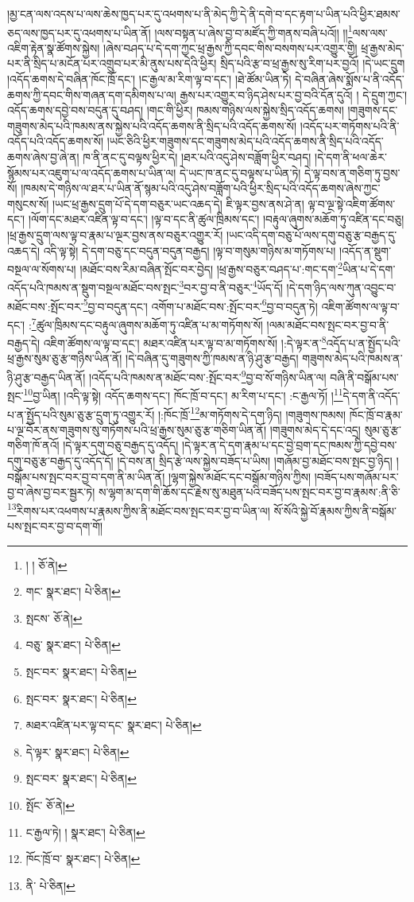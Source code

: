 །མྱ་ངན་ལས་འདས་པ་ལས་ཆེས་ཁྱད་པར་དུ་འཕགས་པ་ནི་མེད་ཀྱི་དེ་ནི་དགེ་བ་དང་རྟག་པ་ཡིན་པའི་ཕྱིར་ཐམས་ཅད་ལས་ཁྱད་པར་དུ་འཕགས་པ་ཡིན་ནོ། །ལས་བསྟན་པ་ཞེས་བྱ་བ་མཛོད་ཀྱི་གནས་བཞི་པའོ།། །།\footnote{། །  ཅོ་ནེ། }ལས་ལས་འཇིག་རྟེན་སྣ་ཚོགས་སྐྱེས། །ཞེས་བཤད་པ་དེ་དག་ཀྱང་ཕྲ་རྒྱས་ཀྱི་དབང་གིས་བསགས་པར་འགྱུར་གྱི། ཕྲ་རྒྱས་མེད་པར་ནི་སྲིད་པ་མངོན་པར་འགྲུབ་པར་མི་ནུས་པས་དེའི་ཕྱིར། སྲིད་པའི་རྩ་བ་ཕྲ་རྒྱས་སུ་རིག་པར་བྱའོ། །དེ་ཡང་དྲུག །འདོད་ཆགས་དེ་བཞིན་ཁོང་ཁྲོ་དང་། །ང་རྒྱལ་མ་རིག་ལྟ་བ་དང་། །ཐེ་ཚོམ་ཡིན་ཏེ། དེ་བཞིན་ཞེས་སྨོས་པ་ནི་འདོད་ཆགས་ཀྱི་དབང་གིས་གཞན་དག་དམིགས་པ་ལ། རྒྱས་པར་འགྱུར་བ་ཉིད་ཤེས་པར་བྱ་བའི་དོན་དུའོ། །
དེ་དྲུག་ཀྱང་། འདོད་ཆགས་དབྱེ་བས་བདུན་དུ་བཤད། །གང་གི་ཕྱིར། ཁམས་གཉིས་ལས་སྐྱེས་སྲིད་འདོད་ཆགས། །གཟུགས་དང་གཟུགས་མེད་པའི་ཁམས་ནས་སྐྱེས་པའི་འདོད་ཆགས་ནི་སྲིད་པའི་འདོད་ཆགས་སོ། །འདོད་པར་གཏོགས་པའི་ནི་འདོད་པའི་འདོད་ཆགས་སོ། །ཡང་ཅིའི་ཕྱིར་གཟུགས་དང་གཟུགས་མེད་པའི་འདོད་ཆགས་ནི་སྲིད་པའི་འདོད་ཆགས་ཞེས་བྱ་ཞེ་ན། ཁ་ནི་ནང་དུ་བལྟས་ཕྱིར་དེ། །ཐར་པའི་འདུ་ཤེས་བཟློག་ཕྱིར་བཤད། །དེ་དག་ནི་ཕལ་ཆེར་སྙོམས་པར་འཇུག་པ་ལ་འདོད་ཆགས་པ་ཡིན་ལ། དེ་ཡང་ཁ་ནང་དུ་བལྟས་པ་ཡིན་ཏེ། དེ་ལྟ་བས་ན་གཅིག་ཏུ་བྱས་སོ། །ཁམས་དེ་གཉིས་ལ་ཐར་པ་ཡིན་ནོ་སྙམ་པའི་འདུ་ཤེས་བཟློག་པའི་ཕྱིར་སྲིད་པའི་འདོད་ཆགས་ཞེས་ཀྱང་གསུངས་སོ། །ཡང་ཕྲ་རྒྱས་དྲུག་པོ་དེ་དག་བཅུར་ཡང་འཆད་དེ། ཇི་ལྟར་བྱས་ནས་ཤེ་ན། ལྟ་བ་ལྔ་སྟེ་འཇིག་ཚོགས་དང་། །ལོག་དང་མཐར་འཛིན་ལྟ་བ་དང་། །ལྟ་བ་དང་ནི་ཚུལ་ཁྲིམས་དང་། །བརྟུལ་ཞུགས་མཆོག་ཏུ་འཛིན་དང་བཅུ། །ཕྲ་རྒྱས་དྲུག་ལས་ལྟ་བ་རྣམ་པ་ལྔར་བྱས་ནས་བཅུར་འགྱུར་རོ། །ཡང་འདི་དག་བཅུ་པོ་ལས་དགུ་བཅུ་རྩ་བརྒྱད་དུ་འཆད་དེ། འདི་ལྟ་སྟེ། དེ་དག་བཅུ་དང་བདུན་བདུན་བརྒྱད། །ལྟ་བ་གསུམ་གཉིས་མ་གཏོགས་པ། །འདོད་ན་སྡུག་བསྔལ་ལ་སོགས་པ། །མཐོང་བས་རིམ་བཞིན་སྤོང་བར་བྱེད། །ཕྲ་རྒྱས་བཅུར་བཤད་པ་:གང་དག་\footnote{གང་  སྣར་ཐང་།  པེ་ཅིན། }ཡིན་པ་དེ་དག་འདོད་པའི་ཁམས་ན་སྡུག་བསྔལ་མཐོང་བས་སྤང་\footnote{སྤངས་  ཅོ་ནེ། }བར་བྱ་བ་ནི་བཅུར་\footnote{བཅུ་  སྣར་ཐང་།  པེ་ཅིན། }ཡོད་དོ། །དེ་དག་ཉིད་ལས་ཀུན་འབྱུང་བ་མཐོང་བས་:སྤོང་བར་\footnote{སྤང་བར་  སྣར་ཐང་།  པེ་ཅིན། }བྱ་བ་བདུན་དང་། འགོག་པ་མཐོང་བས་:སྤོང་བར་\footnote{སྤང་བར་  སྣར་ཐང་།  པེ་ཅིན། }བྱ་བ་བདུན་ཏེ། འཇིག་ཚོགས་ལ་ལྟ་བ་དང་། :\footnote{མཐར་འཛིན་པར་ལྟ་བ་དང་  སྣར་ཐང་།  པེ་ཅིན། }ཚུལ་ཁྲིམས་དང་བརྟུལ་ཞུགས་མཆོག་ཏུ་འཛིན་པ་མ་གཏོགས་སོ། །ལམ་མཐོང་བས་སྤང་བར་བྱ་བ་ནི་བརྒྱད་དེ། འཇིག་ཚོགས་ལ་ལྟ་བ་དང་། མཐར་འཛིན་པར་ལྟ་བ་མ་གཏོགས་སོ། །:དེ་ལྟར་ན་\footnote{དེ་ལྟར་  སྣར་ཐང་།  པེ་ཅིན། }འདོད་པ་ན་སྤྱོད་པའི་ཕྲ་རྒྱས་སུམ་ཅུ་རྩ་གཉིས་ཡིན་ནོ། །དེ་བཞིན་དུ་གཟུགས་ཀྱི་ཁམས་ན་ཉི་ཤུ་རྩ་བརྒྱད། གཟུགས་མེད་པའི་ཁམས་ན་ཉི་ཤུ་རྩ་བརྒྱད་ཡིན་ནོ། །འདོད་པའི་ཁམས་ན་མཐོང་བས་:སྤོང་བར་\footnote{སྤང་བར་  སྣར་ཐང་།  པེ་ཅིན། }བྱ་བ་སོ་གཉིས་ཡིན་ལ། བཞི་ནི་བསྒོམ་པས་སྤང་\footnote{སྤོང་  ཅོ་ནེ། }བྱ་ཡིན། །འདི་ལྟ་སྟེ། འདོད་ཆགས་དང་། ཁོང་ཁྲོ་བ་དང་། མ་རིག་པ་དང་། :ང་རྒྱལ་ཏོ། །\footnote{ང་རྒྱལ་ཏེ། །  སྣར་ཐང་།  པེ་ཅིན། }དེ་དག་ནི་འདོད་པ་ན་སྤྱོད་པའི་སུམ་ཅུ་རྩ་དྲུག་ཏུ་འགྱུར་རོ། །:ཁོང་ཁྲོ་\footnote{ཁོང་ཁྲོ་བ་  སྣར་ཐང་།  པེ་ཅིན། }མ་གཏོགས་དེ་དག་ཉིད། །གཟུགས་ཁམས། ཁོང་ཁྲོ་བ་རྣམ་པ་ལྔ་བོར་ནས་གཟུགས་སུ་གཏོགས་པའི་ཕྲ་རྒྱས་སུམ་ཅུ་རྩ་གཅིག་ཡིན་ནོ། །གཟུགས་མེད་དེ་དང་འདྲ། སུམ་ཅུ་རྩ་གཅིག་ཁོ་ནའོ། །དེ་ལྟར་དགུ་བཅུ་བརྒྱད་དུ་འདོད། །དེ་ལྟར་ན་དེ་དག་རྣམ་པ་དང་བྱེ་བྲག་དང་ཁམས་ཀྱི་དབྱེ་བས་དགུ་བཅུ་རྩ་བརྒྱད་དུ་འདོད་དོ། །དེ་བས་ན། སྲིད་རྩེ་ལས་སྐྱེས་བཟོད་པ་ཡིས། །གཞོམ་བྱ་མཐོང་བས་སྤང་བྱ་ཉིད། །བསྒོམ་པས་སྤང་བར་བྱ་བ་དག་ནི་མ་ཡིན་ནོ། །ལྷག་སྐྱེས་མཐོང་དང་བསྒོམ་གཉིས་ཀྱིས། །བཟོད་པས་གཞོམ་པར་བྱ་བ་ཞེས་བྱ་བར་སྦྱར་ཏེ། ས་ལྷག་མ་དག་གི་ཆོས་དང་རྗེས་སུ་མཐུན་པའི་བཟོད་པས་སྤང་བར་བྱ་བ་རྣམས་:ནི་ཅི་\footnote{ནི་  པེ་ཅིན། }རིགས་པར་འཕགས་པ་རྣམས་ཀྱིས་ནི་མཐོང་བས་སྤང་བར་བྱ་བ་ཡིན་ལ། སོ་སོའི་སྐྱེ་བོ་རྣམས་ཀྱིས་ནི་བསྒོམ་པས་སྤང་བར་བྱ་བ་དག་གོ། 
